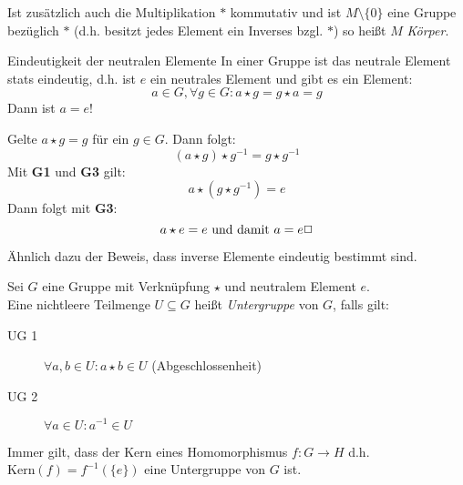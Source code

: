 \vspace{1em}
Ist zusätzlich auch die Multiplikation $*$ kommutativ und ist $M\setminus\{0\}$ eine Gruppe bezüglich $*$ (d.h. besitzt jedes Element ein Inverses bzgl. $*$) so heißt $M$ \emph{Körper}.
\par

\begin{satz}{Eindeutigkeit der neutralen Elemente}
  In einer Gruppe ist das neutrale Element stats eindeutig, d.h. ist $e$ ein neutrales Element und gibt es ein Element:
  \begin{equation*}
    a\in G, \forall g\in G : a\star g = g\star a = g
  \end{equation*}
  Dann ist $a = e$!
\end{satz}


\beweis
Gelte $a\star g = g$ für ein $g\in G$. Dann folgt:
\begin{equation*}
  (a\star g)\star g^{-1}=g\star g^{-1}
\end{equation*}
Mit \textbf{G1} und \textbf{G3} gilt:
\begin{equation*}
  a\star (g\star g^{-1})=e
\end{equation*}
Dann folgt mit \textbf{G3}:
\begin{equation*}
  a\star e=e \text{ und damit } a=e \hfill\Box
\end{equation*}

\bemerkung
Ähnlich dazu der Beweis, dass inverse Elemente eindeutig bestimmt sind.


Sei $G$ eine Gruppe mit Verknüpfung $\star$ und neutralem Element $e$.\\
Eine nichtleere Teilmenge $U\subseteq G$ heißt \emph{Untergruppe} von $G$, falls gilt:
\begin{description}
  \item[UG 1] $\forall a,b\in U : a\star b\in U$ (Abgeschlossenheit)
  \item[UG 2] $\forall a\in U : a^{-1}\in U$
\end{description}

Immer gilt, dass der Kern eines Homomorphismus $f:G \rightarrow H$ d.h. $\mathrm{Kern}(f)=f^{-1}(\{e\})$  eine Untergruppe von $G$ ist.
